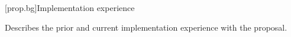 [prop.bg]{Implementation experience}

Describes the prior and current implementation experience with the proposal.